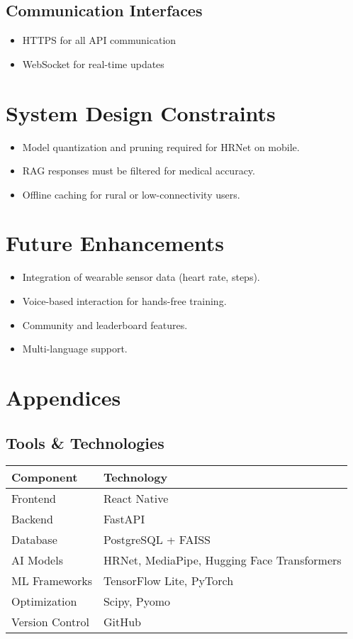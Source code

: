\documentclass[12pt,a4paper]{article}
\begin{document}
\subsection{Communication Interfaces}
\begin{itemize}[leftmargin=*]
    \item HTTPS for all API communication
    \item WebSocket for real-time updates
\end{itemize}

\section{System Design Constraints}
\begin{itemize}[leftmargin=*]
    \item Model quantization and pruning required for HRNet on mobile.
    \item RAG responses must be filtered for medical accuracy.
    \item Offline caching for rural or low-connectivity users.
\end{itemize}

\section{Future Enhancements}
\begin{itemize}[leftmargin=*]
    \item Integration of wearable sensor data (heart rate, steps).
    \item Voice-based interaction for hands-free training.
    \item Community and leaderboard features.
    \item Multi-language support.
\end{itemize}

\section{Appendices}

\subsection{Tools \& Technologies}
\begin{table}[h!]
\centering
\begin{tabular}{>{\raggedright\arraybackslash}p{4cm}>{\raggedright\arraybackslash}p{9cm}}
\toprule
\textbf{Component} & \textbf{Technology} \\
\midrule
Frontend & React Native \\
Backend & FastAPI \\
Database & PostgreSQL + FAISS \\
AI Models & HRNet, MediaPipe, Hugging Face Transformers \\
ML Frameworks & TensorFlow Lite, PyTorch \\
Optimization & Scipy, Pyomo \\
Version Control & GitHub \\
\bottomrule
\end{tabular}
\end{table}
\end{document}
